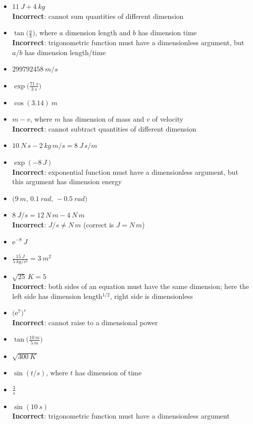 \documentclass[a4paper,12pt,%
onecolumn,oneside,%
british%
]{memoir}
\newcommand*{\e}{\ensuremath{\mathrm{e}}}
\renewcommand*{\|}[1][]{\nonscript\:#1\vert\nonscript\:\mathopen{}}
\begin{document}
\begin{itemize}[label=$\triangleright$\enskip,itemsep=1ex]
\item $\displaystyle\qty{11}{J} + \qty{4}{kg}$\\%
  \textbf{Incorrect}: cannot sum quantities of different dimension
\item $\displaystyle\tan\biggl(\frac{a}{b}\biggr)$, where $a$ dimension \textsf{length} and $b$ has dimension \textsf{time}\\%
  \textbf{Incorrect}: trigonometric function must have a dimensionless argument, but $a/b$ has dimension \textsf{length}/\textsf{time}
\item $\displaystyle\qty{299792458}{m/s}$
\item $\displaystyle\exp\biggl(\frac{\qty{71}{s}}{\qty{3}{s}}\biggr)$
\item $\displaystyle\cos(\num{3.14})\:\unit{m}$
\item $\displaystyle m - v$, where $m$ has dimension of \textsf{mass} and $v$ of \textsf{velocity}\\%
  \textbf{Incorrect}: cannot subtract quantities of different dimension
\item $\displaystyle \qty{10}{N\, s}-\qty{2}{kg\, m/s} = \qty{8}{J\, s/m}$
\item $\displaystyle\exp(-8\,\unit{J})$\\%
  \textbf{Incorrect}: exponential function must have a dimensionless argument, but this argument has dimension \textsf{energy}
\item $\displaystyle\bigl(\qty{9}{m},\, \qty{0.1}{rad},\, -\qty{0.5}{rad}\bigr)$
\item $\displaystyle\qty{8}{J/s}=\qty{12}{N\,m}-\qty{4}{N\,m}$\\%
  \textbf{Incorrect}: $\unit{J/s} \ne \unit{N\,m}$ (correct is $\unit{J} = \unit{N\,m}$)
\item $\displaystyle\e^{-8}\:\unit{J}$
\item $\displaystyle\frac{\qty{15}{J}}{\qty{5}{kg/s^{2}}} = \qty{3}{m^{2}}$
\item $\displaystyle \sqrt{25}\,\unit{K} = 5$\\%
  \textbf{Incorrect}: both sides of an equation must have the same dimension; here the left side has dimension \textsf{length}${}^{1/2}$, right side is dimensionless
\item $\displaystyle\bigl(\e^{7}\bigr)^{\unit{s}}$\\%
  \textbf{Incorrect}: cannot raise to a dimensional power
\item $\displaystyle\tan\biggl(\frac{\qty{10}{m}}{\qty{5}{m}}\biggr)$
\item $\displaystyle\sqrt{\qty{300}{K}\,}$
\item $\displaystyle\sin(t/\unit{s})$, where $t$ has dimension of \textsf{time}
\item $\displaystyle\frac{3}{\unit{s}}$
\item $\displaystyle\sin(\qty{10}{s})$\\%
  \textbf{Incorrect}: trigonometric function must have a dimensionless argument
\end{itemize}
\end{document}
